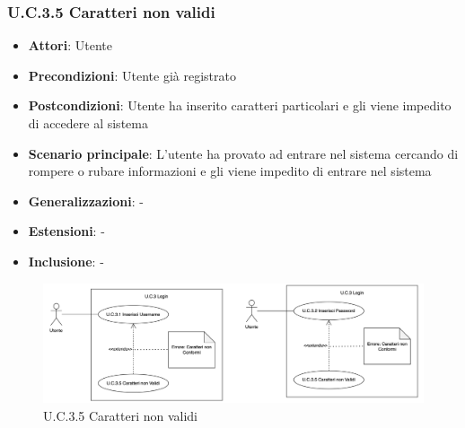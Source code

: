 \subsubsection{U.C.3.5 Caratteri non validi}
\begin{itemize}
    \item \textbf{Attori}: Utente
    \item \textbf{Precondizioni}: Utente già registrato
    \item \textbf{Postcondizioni}: Utente ha inserito caratteri particolari e gli viene impedito di accedere al sistema
    \item \textbf{Scenario principale}: L’utente ha provato ad entrare nel sistema cercando di rompere o rubare informazioni e gli viene impedito di entrare nel sistema
    \item \textbf{Generalizzazioni}: -
    \item \textbf{Estensioni}: -
    \item \textbf{Inclusione}: -
\end{itemize}
\begin{figure}[H]
    \centering
    \includegraphics[width=\textwidth]{img/UC3-5.png}
    \caption{U.C.3.5 Caratteri non validi}
\end{figure}
